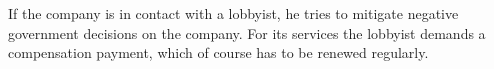 If the company is in contact with a lobbyist, he tries to mitigate negative government decisions on the company. For its services the lobbyist demands a compensation payment, which of course has to be renewed regularly.


